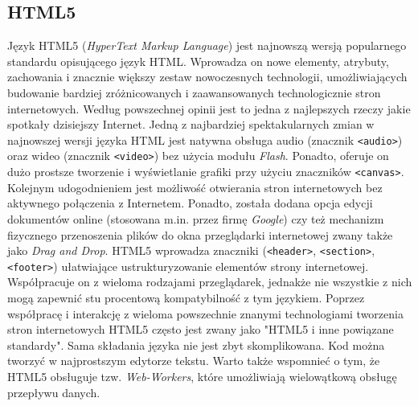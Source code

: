 \subsection{HTML5}
Język HTML5 (\textit{HyperText Markup Language}) jest najnowszą wersją popularnego standardu opisującego język HTML. Wprowadza on nowe elementy, atrybuty, zachowania i znacznie większy zestaw nowoczesnych technologii, umożliwiających budowanie bardziej zróżnicowanych i zaawansowanych technologicznie stron internetowych. Według powszechnej opinii jest to jedna z najlepszych rzeczy jakie spotkały dzisiejszy Internet. Jedną z najbardziej spektakularnych zmian w najnowszej wersji języka HTML jest natywna obsługa audio (znacznik \texttt{<audio>}) oraz wideo (znacznik \texttt{<video>}) bez użycia modułu \textit{Flash}. Ponadto, oferuje on dużo prostsze tworzenie i wyświetlanie grafiki przy użyciu znaczników \texttt{<canvas>}. Kolejnym udogodnieniem jest możliwość otwierania stron internetowych bez aktywnego połączenia z Internetem. Ponadto, została dodana opcja edycji dokumentów online (stosowana m.in. przez firmę \textit{Google}) czy też mechanizm fizycznego przenoszenia plików do okna przeglądarki internetowej zwany także jako \textit{Drag and Drop}. HTML5 wprowadza znaczniki (\texttt{<header>}, \texttt{<section>}, \texttt{<footer>}) ułatwiające ustrukturyzowanie elementów strony internetowej. Współpracuje on z wieloma rodzajami przeglądarek, jednakże nie wszystkie z nich mogą zapewnić stu procentową kompatybilność z tym językiem. Poprzez współpracę i interakcję z wieloma powszechnie znanymi technologiami tworzenia stron internetowych HTML5 często jest zwany jako "HTML5 i inne powiązane standardy". Sama składania języka nie jest zbyt skomplikowana. Kod można tworzyć w najprostszym edytorze tekstu. Warto także wspomnieć o tym, że HTML5 obsługuje tzw. \textit{Web-Workers}, które umożliwiają wielowątkową obsługę przepływu danych. \cite{Html}

